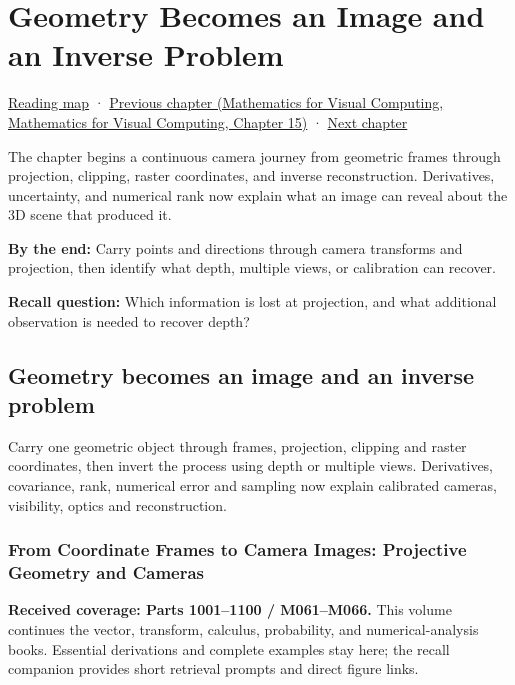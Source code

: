 \hypertarget{02-foundations-ii-ch032}{}
\chapter{Geometry Becomes an Image and an Inverse Problem}\label{stagechapter:02-foundations-ii-ch032}\label{02-foundations-ii-ch032-geometry-becomes-an-image-and-an-inverse-problem}

\hyperref[volume-reading-map]{Reading map} · \href{../02-Mathematics-for-Visual-Computing/main.pdf\#nameddest=02-foundations-ii-ch031-implement-probability-with-numerical-contracts}{Previous chapter (Mathematics for Visual Computing, Mathematics for Visual Computing, Chapter 15)} · \hyperref[02-foundations-ii-ch033-projection-clipping-and-raster-sampling]{Next chapter}

The chapter begins a continuous camera journey from geometric frames through projection, clipping, raster coordinates, and inverse reconstruction. Derivatives, uncertainty, and numerical rank now explain what an image can reveal about the 3D scene that produced it.

\textbf{By the end:} Carry points and directions through camera transforms and projection, then identify what depth, multiple views, or calibration can recover.

\textbf{Recall question:} Which information is lost at projection, and what additional observation is needed to recover depth?

\section{Geometry becomes an image and an inverse problem}\label{02-foundations-ii-ch032-geometry-becomes-an-image-and-an-inverse-problem-1}

Carry one geometric object through frames, projection, clipping and raster coordinates, then invert the process using depth or multiple views. Derivatives, covariance, rank, numerical error and sampling now explain calibrated cameras, visibility, optics and reconstruction.

\subsection{From Coordinate Frames to Camera Images: Projective Geometry and Cameras}\label{02-foundations-ii-ch032-from-coordinate-frames-to-camera-images-projective-geometry-and-cameras}

\textbf{Received coverage: Parts 1001--1100 / M061--M066.} This volume continues the vector, transform, calculus, probability, and numerical-analysis books. Essential derivations and complete examples stay here; the recall companion provides short retrieval prompts and direct figure links.


